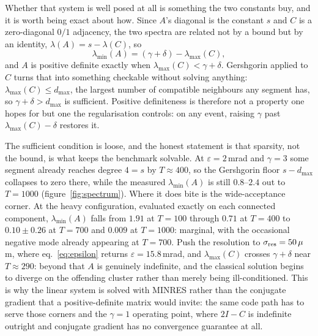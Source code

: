 \documentclass[11pt,a4paper]{article}
\begin{document}
Whether that system is well posed at all is something the two constants
buy, and it is worth being exact about how. Since $A$'s diagonal is the
constant $s$ and $C$ is a zero-diagonal $0/1$ adjacency, the two spectra
are related not by a bound but by an identity,
$\lambda(A)=s-\lambda(C)$, so
\begin{equation}
\lambda_{\min}(A)=(\gamma+\delta)-\lambda_{\max}(C),
\label{eq:lammin}
\end{equation}
and $A$ is positive definite exactly when $\lambda_{\max}(C)<\gamma+\delta$.
Gershgorin applied to $C$ turns that into something checkable without
solving anything: $\lambda_{\max}(C)\le d_{\max}$, the largest number of
compatible neighbours any segment has, so $\gamma+\delta>d_{\max}$ is
sufficient. Positive definiteness is therefore not a property one hopes
for but one the regularisation controls: on any event, raising $\gamma$
past $\lambda_{\max}(C)-\delta$ restores it.

The sufficient condition is loose, and the honest statement is that
sparsity, not the bound, is what keeps the benchmark solvable. At
$\varepsilon=2$\,mrad and $\gamma=3$ some segment already reaches degree
$4=s$ by $T\approx400$, so the Gershgorin floor $s-d_{\max}$ collapses to
zero there, while the measured $\lambda_{\min}(A)$ is still $0.8$--$2.4$
out to $T=1000$ (figure~\ref{fig:spectrum}). Where it does bite is the wide-acceptance corner. At the
heavy configuration, evaluated exactly on each connected component,
$\lambda_{\min}(A)$ falls from $1.91$ at $T=100$ through $0.71$ at
$T=400$ to $0.10\pm0.26$ at $T=700$ and $0.009$ at $T=1000$: marginal,
with the occasional negative mode already appearing at $T=700$. Push the
resolution to $\sigma_{\rm res}=50\,\mu$m, where
eq.~\eqref{eq:epsilon} returns $\varepsilon=15.8$\,mrad, and
$\lambda_{\max}(C)$ crosses $\gamma+\delta$ near $T\approx290$: beyond
that $A$ is genuinely indefinite, and the classical solution begins to
diverge on the offending cluster rather than merely being ill-conditioned.
This is why the linear system is solved with MINRES rather than the
conjugate gradient that a positive-definite matrix would invite: the same
code path has to serve those corners and the $\gamma=1$ operating point,
where $2I-C$ is indefinite outright and conjugate gradient has no
convergence guarantee at all.
\end{document}
